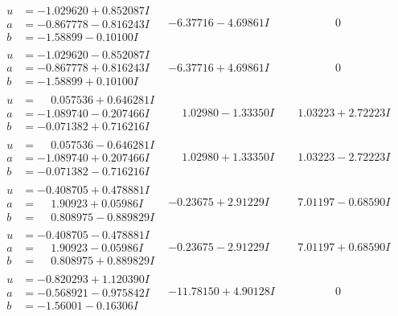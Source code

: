 \documentclass[1p]{elsarticle_modified}
\theoremstyle{definition}
\begin{document}
$$\begin{array}{c|c|c}
\begin{aligned}
u &= -1.029620 + 0.852087 I \\
a &= -0.867778 - 0.816243 I \\
b &= -1.58899 - 0.10100 I\end{aligned}
 & -6.37716 - 4.69861 I & \phantom{-0.000000 } 0 \\ \hline\begin{aligned}
u &= -1.029620 - 0.852087 I \\
a &= -0.867778 + 0.816243 I \\
b &= -1.58899 + 0.10100 I\end{aligned}
 & -6.37716 + 4.69861 I & \phantom{-0.000000 } 0 \\ \hline\begin{aligned}
u &= \phantom{-}0.057536 + 0.646281 I \\
a &= -1.089740 - 0.207466 I \\
b &= -0.071382 + 0.716216 I\end{aligned}
 & \phantom{-}1.02980 - 1.33350 I & \phantom{-}1.03223 + 2.72223 I \\ \hline\begin{aligned}
u &= \phantom{-}0.057536 - 0.646281 I \\
a &= -1.089740 + 0.207466 I \\
b &= -0.071382 - 0.716216 I\end{aligned}
 & \phantom{-}1.02980 + 1.33350 I & \phantom{-}1.03223 - 2.72223 I \\ \hline\begin{aligned}
u &= -0.408705 + 0.478881 I \\
a &= \phantom{-}1.90923 + 0.05986 I \\
b &= \phantom{-}0.808975 - 0.889829 I\end{aligned}
 & -0.23675 + 2.91229 I & \phantom{-}7.01197 - 0.68590 I \\ \hline\begin{aligned}
u &= -0.408705 - 0.478881 I \\
a &= \phantom{-}1.90923 - 0.05986 I \\
b &= \phantom{-}0.808975 + 0.889829 I\end{aligned}
 & -0.23675 - 2.91229 I & \phantom{-}7.01197 + 0.68590 I \\ \hline\begin{aligned}
u &= -0.820293 + 1.120390 I \\
a &= -0.568921 - 0.975842 I \\
b &= -1.56001 - 0.16306 I\end{aligned}
 & -11.78150 + 4.90128 I & \phantom{-0.000000 } 0 \\ \hline\begin{aligned}

\end{aligned}
\end{array}$$
\end{document}

